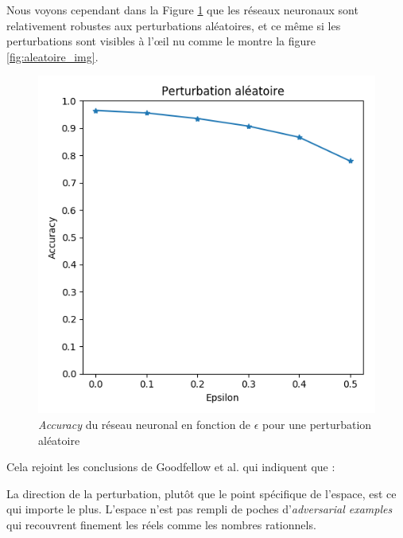 \documentclass[10pt,twocolumn,letterpaper]{article}
\begin{document}
Nous voyons cependant dans la Figure \ref{fig:aleatoire_plot} que les réseaux neuronaux sont relativement robustes aux perturbations aléatoires, et ce même si les perturbations sont visibles à l'œil nu comme le montre la figure \ref{fig:aleatoire_img}.

\begin{figure}[!ht]
\begin{center}
\includegraphics[width=0.85\linewidth]{ressources/aleatoire_plot.png}
\end{center}
   \caption{\textit{Accuracy} du réseau neuronal en fonction de $\epsilon$ pour une perturbation aléatoire}
\label{fig:aleatoire_plot}
\end{figure}

Cela rejoint les conclusions de Goodfellow et al. \cite{goodfellow2014explaining} qui indiquent que :

\begin{displayquote}
La direction de la perturbation, plutôt que le point spécifique de l'espace, est ce qui importe le plus. L'espace n'est pas rempli de poches d'\textit{adversarial examples} qui recouvrent finement les réels comme les nombres rationnels.
\end{displayquote}
\end{document}
